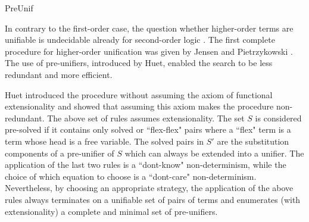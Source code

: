 \begin{entry}{PreUnif}
 \begin{history}
   In contrary to the first-order case,
   the question whether higher-order terms are unifiable is
   undecidable already for second-order logic \cite{goldfarb81tcs}.
   The first complete procedure for higher-order unification was given by
   Jensen and Pietrzykowski \cite{jensen76tcs}.
   The use of pre-unifiers, introduced by Huet, enabled the search to
   be less redundant and more efficient.
 \end{history}

\begin{technicalities}
  Huet \cite{huet75tcs} introduced the procedure without assuming
  the axiom of functional extensionality and showed that assuming this axiom
  makes the procedure non-redundant.
  The above set of rules assumes extensionality.
The set $S$ is considered
   pre-solved if it contains only solved or ``flex-flex" pairs where a ``flex" term
   is a term whose head is a free variable.
   The solved pairs in $S'$ are the substitution components \cite{Robinson1965JACM} of a
   pre-unifier of $S$ which can always be extended into a unifier.
  The application of the last two rules is
  a ``dont-know" non-determinism, while the choice of which equation to choose
  is a ``dont-care" non-determinism. Nevertheless, by choosing an appropriate strategy,
   the application of the above rules always terminates on a unifiable set of pairs of terms
   and enumerates (with extensionality) a complete and minimal set of pre-unifiers.
 \end{technicalities}



%
%
%
%
%
%
%
%




\end{entry}
